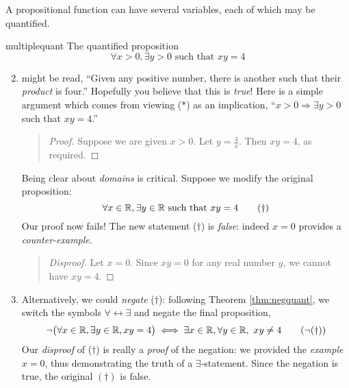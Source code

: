 

\goodbreak


\label{pg:multquant}

A propositional function can have several variables, each of which may be quantified.

\begin{examples}{}{multiplequant}
	\exstart The quantified proposition
	\[
		\forall x>0,\exists y>0\text{ such that }xy=4 \tag{$\ast$}
	\]
	\begin{enumerate}\setcounter{enumi}{1}
	  \item[]might be read, ``Given any positive number, there is another such that their \emph{product} is four.''	Hopefully you believe that this is \emph{true}! Here is a simple argument which comes from viewing ($\ast$) as an implication, ``$x>0 \Longrightarrow\exists y>0$ such that $xy=4$.''
	\begin{quote}
		\begin{proof}
			Suppose we are given $x>0$. Let $y=\frac 4x$. Then $xy=4$, as required.
		\end{proof}
	\end{quote}Being clear about \emph{domains} is critical. Suppose we modify the original proposition:
		\[
			\forall x\in\mathbb{R},\exists y\in\mathbb{R}\text{ such that }xy=4 \tag{$\dag$}
		\]
		Our proof now fails! The new statement ($\dag$) is \emph{false}: indeed $x=0$ provides a \emph{counter-example.}
	\begin{quote}
		\begin{proof}[Disproof]
			Let $x=0$. Since $xy=0$ for any real number $y$, we cannot have $xy=4$.
		\end{proof}
	\end{quote}
	  \item[] Alternatively, we could \emph{negate} ($\dag$): following Theorem \ref{thm:negquant}, we switch the symbols $\forall\leftrightarrow\exists$ and negate the final proposition,\footnotemark{}
		\[
			\neg\bigl(\forall x\in\mathbb{R},\exists y\in\mathbb{R}, xy=4\bigr) \iff \exists x\in\mathbb{R}, \forall y\in\mathbb{R},\ xy\neq 4 \tag{$\neg (\dag)$}
		\]
		Our \emph{disproof} of ($\dag$) is really a \emph{proof} of the negation: we provided the \emph{example} $x=0$, thus demonstrating the truth of a $\exists$-statement. Since the negation is true, the original $(\dag)$ is false.
		

\end{enumerate}
\end{examples}

